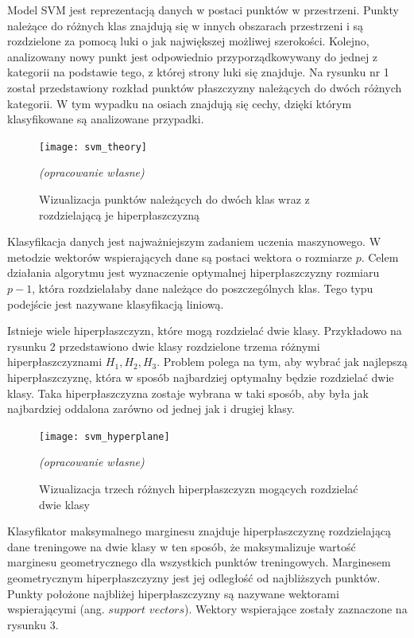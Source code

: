 \documentclass[[10pt,a4paper]{article}
\begin{document}
Model SVM jest reprezentacją danych w postaci punktów w przestrzeni. Punkty należące do różnych klas znajdują się w innych obszarach przestrzeni i są rozdzielone za pomocą luki o jak największej możliwej szerokości. Kolejno, analizowany nowy punkt jest odpowiednio przyporządkowywany do jednej z kategorii na podstawie tego, z której strony luki się znajduje. Na rysunku nr 1 został przedstawiony rozkład punktów płaszczyzny należących do dwóch różnych kategorii. W tym wypadku na osiach znajdują się cechy, dzięki którym klasyfikowane są analizowane przypadki.
\vspace{5mm}
\begin{figure}[h]
\centering
\texttt{[image: svm\_theory]}\\
\caption{Wizualizacja punktów należących do dwóch klas wraz z rozdzielającą je hiperpłaszczyzną} 
\textit{(opracowanie własne)}
\end{figure}

\vspace{10mm}
Klasyfikacja danych jest najważniejszym zadaniem uczenia maszynowego. W metodzie wektorów wspierających dane są postaci wektora o rozmiarze $p$. Celem działania algorytmu jest wyznaczenie optymalnej hiperpłaszczyzny rozmiaru $p-1$, która rozdzielałaby dane należące do poszczególnych klas.
Tego typu podejście jest nazywane klasyfikacją liniową. 
\vspace{5mm}


\indent Istnieje wiele hiperpłaszczyzn, które mogą rozdzielać dwie klasy. Przykładowo na rysunku 2 przedstawiono dwie klasy rozdzielone trzema różnymi hiperpłaszczyznami $H_1, H_2, H_3$. Problem polega na tym, aby wybrać jak najlepszą hiperpłaszczyznę, która w sposób najbardziej optymalny będzie rozdzielać dwie klasy. Taka hiperpłaszczyzna zostaje wybrana w taki sposób, aby była jak najbardziej oddalona zarówno od jednej jak i drugiej klasy. 


\begin{figure}[h]
\centering
\texttt{[image: svm\_hyperplane]}\\
\caption{Wizualizacja trzech różnych hiperpłaszczyzn mogących rozdzielać dwie klasy }
\textit{(opracowanie własne)}
\end{figure}

\newpage
Klasyfikator maksymalnego marginesu znajduje hiperpłaszczyznę rozdzielającą dane treningowe na dwie klasy w ten sposób, że maksymalizuje wartość marginesu geometrycznego dla wszystkich punktów treningowych. Marginesem geometrycznym hiperpłaszczyzny jest jej odległość od najbliższych punktów. Punkty położone najbliżej hiperpłaszczyzny są nazywane wektorami wspierającymi (ang. $support$ $vectors$). Wektory wspierające zostały zaznaczone na rysunku 3.
\end{document}

